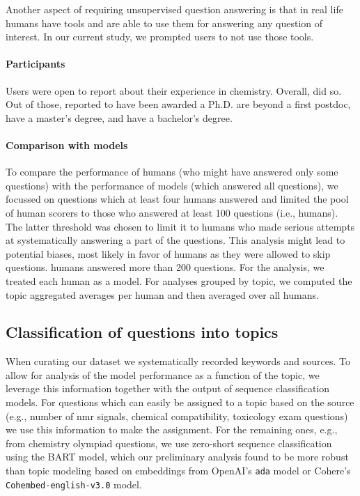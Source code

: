 \documentclass[11pt, oneside]{article}
\begin{document}
\begin{refsection}
Another aspect of requiring unsupervised question answering is that in real life humans have tools and are able to use them for answering any question of interest. 
In our current study, we prompted users to not use those tools.

\paragraph{Participants}
Users were open to report about their experience in chemistry. 
Overall,  did so. 
Out of those,  reported to have been awarded a Ph.D.
 are beyond a first postdoc,  have a master's degree, and  have a bachelor's degree.


\paragraph{Comparison with models}
To compare the performance of humans (who might have answered only some questions) with the performance of models (which answered all questions), we focussed on questions which at least four humans answered and limited the pool of human scorers to those who answered at least 100 questions (i.e.,  humans). 
The latter threshold was chosen to limit it to humans who made serious attempts at systematically answering a part of the questions. 
This analysis might lead to potential biases, most likely in favor of humans as they were allowed to skip questions.  humans answered more than 200 questions.
For the analysis, we treated each human as a model. For analyses grouped by topic, we computed the topic aggregated averages per human and then averaged over all humans.

\subsection{Classification of questions into topics}\label{sec:meth-topic} When curating our dataset we systematically recorded keywords and sources.
To allow for analysis of the model performance as a function of the topic, we leverage this information together with the output of sequence classification models.
For questions which can easily be assigned to a topic based on the source (e.g., number of \gls{nmr} signals, chemical compatibility, toxicology exam questions) we use this information to make the assignment.
For the remaining ones, e.g., from chemistry olympiad questions, we use zero-short sequence classification\autocite{zeroshotsequence} using the BART model\autocite{bart, FacebookBART}, which our preliminary analysis found to be more robust than topic modeling based on embeddings from OpenAI's \texttt{ada} model or Cohere's \texttt{Cohembed-english-v3.0} model.



\end{refsection}
\end{document}
